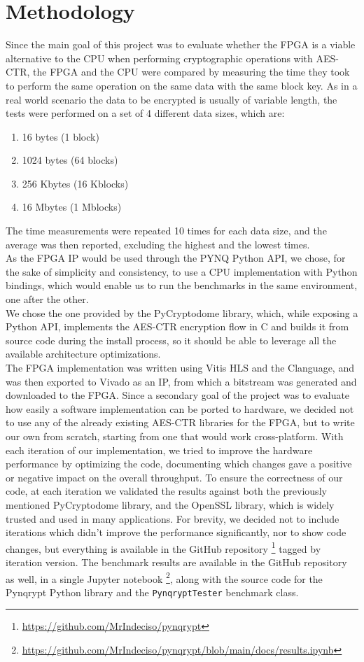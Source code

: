\documentclass[12pt,oneside,a4paper]{article}
\def\CC{{C\nolinebreak[4]\hspace{-.05em}\raisebox{.4ex}{\tiny\bf ++}}}
\begin{document}
\section{Methodology} \label{sec:methodology}
Since the main goal of this project was to evaluate whether the FPGA is a viable alternative to the CPU when performing cryptographic operations with AES-CTR, the FPGA and the CPU were compared by measuring the time they took to perform the same operation on the same data with the same block key.
As in a real world scenario the data to be encrypted is usually of variable length, the tests were performed on a set of 4 different data sizes, which are:
\begin{enumerate}
	\item 16 bytes (1 block)
	\item 1024 bytes (64 blocks)
	\item 256 Kbytes (16 Kblocks)
	\item 16 Mbytes (1 Mblocks)
\end{enumerate}
The time measurements were repeated 10 times for each data size, and the average was then reported, excluding the highest and the lowest times.
\\As the FPGA IP would be used through the PYNQ Python API, we chose, for the sake of simplicity and consistency, to use a CPU implementation with Python bindings, which would enable us to run the benchmarks in the same environment, one after the other.
\\We chose the one provided by the PyCryptodome library, which, while exposing a Python API, implements the AES-CTR encryption flow in C and builds it from source code during the install process, so it should be able to leverage all the available architecture optimizations.
\\The FPGA implementation was written using Vitis HLS and the \CC language, and was then exported to Vivado as an IP, from which a bitstream was generated and downloaded to the FPGA.
Since a secondary goal of the project was to evaluate how easily a software implementation can be ported to hardware, we decided not to use any of the already existing AES-CTR libraries for the FPGA, but to write our own from scratch, starting from one that would work cross-platform.
With each iteration of our implementation, we tried to improve the hardware performance by optimizing the code, documenting which changes gave a positive or negative impact on the overall throughput.
To ensure the correctness of our code, at each iteration we validated the results against both the previously mentioned PyCryptodome library, and the OpenSSL library, which is widely trusted and used in many applications.
For brevity, we decided not to include iterations which didn't improve the performance significantly, nor to show code changes, but everything is available in the GitHub repository \footnote{\url{https://github.com/MrIndeciso/pynqrypt}} tagged by iteration version.
The benchmark results are available in the GitHub repository as well, in a single Jupyter notebook \footnote{\url{https://github.com/MrIndeciso/pynqrypt/blob/main/docs/results.ipynb}}, along with the source code for the Pynqrypt Python library and the \texttt{PynqryptTester} benchmark class.
\end{document}
